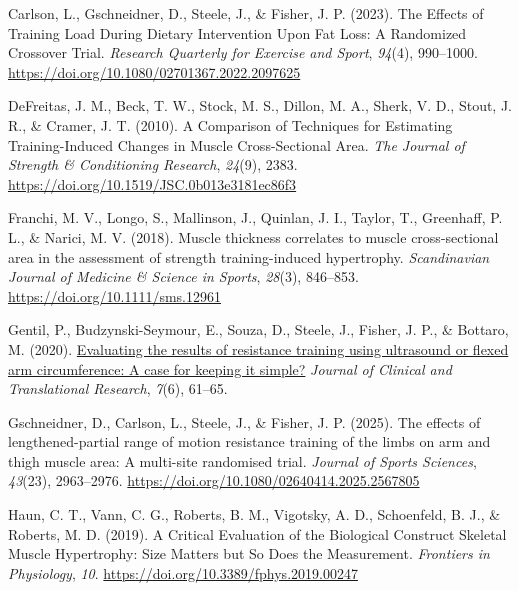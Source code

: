 \documentclass[
]{article}
\newlength{\cslhangindent}
\newenvironment{CSLReferences}[2] %
 {\begin{list}{}{%
  \setlength{\itemindent}{0pt}
  \setlength{\leftmargin}{0pt}
  \setlength{\parsep}{0pt}
  \ifodd #1
   \setlength{\leftmargin}{\cslhangindent}
   \setlength{\itemindent}{-1\cslhangindent}
  \fi
  \setlength{\itemsep}{#2\baselineskip}}}
 {\end{list}}
\begin{document}
\label{refs}
\begin{CSLReferences}{1}{0}
Carlson, L., Gschneidner, D., Steele, J., \& Fisher, J. P. (2023). The
{Effects} of {Training Load During Dietary Intervention Upon Fat Loss}:
{A Randomized Crossover Trial}. \emph{Research Quarterly for Exercise
and Sport}, \emph{94}(4), 990--1000.
\url{https://doi.org/10.1080/02701367.2022.2097625}

DeFreitas, J. M., Beck, T. W., Stock, M. S., Dillon, M. A., Sherk, V.
D., Stout, J. R., \& Cramer, J. T. (2010). A {Comparison} of
{Techniques} for {Estimating Training-Induced Changes} in {Muscle
Cross-Sectional Area}. \emph{The Journal of Strength \& Conditioning
Research}, \emph{24}(9), 2383.
\url{https://doi.org/10.1519/JSC.0b013e3181ec86f3}

Franchi, M. V., Longo, S., Mallinson, J., Quinlan, J. I., Taylor, T.,
Greenhaff, P. L., \& Narici, M. V. (2018). Muscle thickness correlates
to muscle cross-sectional area in the assessment of strength
training-induced hypertrophy. \emph{Scandinavian Journal of Medicine \&
Science in Sports}, \emph{28}(3), 846--853.
\url{https://doi.org/10.1111/sms.12961}

Gentil, P., Budzynski-Seymour, E., Souza, D., Steele, J., Fisher, J. P.,
\& Bottaro, M. (2020).
\href{https://www.ncbi.nlm.nih.gov/pmc/articles/PMC7787222}{Evaluating
the results of resistance training using ultrasound or flexed arm
circumference: {A} case for keeping it simple?} \emph{Journal of
Clinical and Translational Research}, \emph{7}(6), 61--65.

Gschneidner, D., Carlson, L., Steele, J., \& Fisher, J. P. (2025). The
effects of lengthened-partial range of motion resistance training of the
limbs on arm and thigh muscle area: {A} multi-site randomised trial.
\emph{Journal of Sports Sciences}, \emph{43}(23), 2963--2976.
\url{https://doi.org/10.1080/02640414.2025.2567805}

Haun, C. T., Vann, C. G., Roberts, B. M., Vigotsky, A. D., Schoenfeld,
B. J., \& Roberts, M. D. (2019). A {Critical Evaluation} of the
{Biological Construct Skeletal Muscle Hypertrophy}: {Size Matters} but
{So Does} the {Measurement}. \emph{Frontiers in Physiology}, \emph{10}.
\url{https://doi.org/10.3389/fphys.2019.00247}


\end{CSLReferences}
\end{document}
